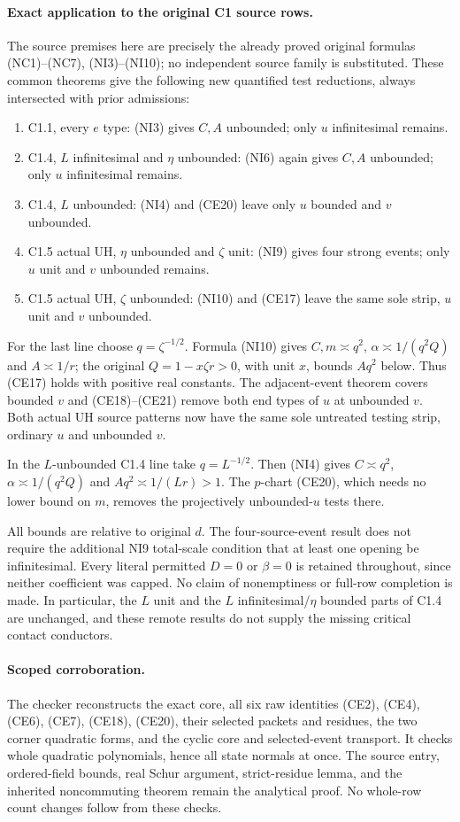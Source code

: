 \paragraph{Exact application to the original C1 source rows.}
The source premises here are precisely the already proved original
formulas (NC1)--(NC7), (NI3)--(NI10); no independent source family is
substituted. These common theorems give the following new quantified
test reductions, always intersected with prior admissions:
\begin{enumerate}
\item C1.1, every $e$ type: (NI3) gives $C,A$ unbounded;
only $u$ infinitesimal remains.
\item C1.4, $L$ infinitesimal and $\eta$ unbounded: (NI6)
again gives $C,A$ unbounded; only $u$ infinitesimal remains.
\item C1.4, $L$ unbounded: (NI4) and (CE20) leave only
$u$ bounded and $v$ unbounded.
\item C1.5 actual UH, $\eta$ unbounded and $\zeta$ unit:
(NI9) gives four strong events; only $u$ unit and $v$ unbounded remains.
\item C1.5 actual UH, $\zeta$ unbounded: (NI10) and (CE17)
leave the same sole strip, $u$ unit and $v$ unbounded.
\end{enumerate}
For the last line choose $q=\zeta^{-1/2}$. Formula (NI10) gives
$C,m\asymp q^2$, $\alpha\asymp1/(q^2Q)$ and $A\asymp1/r$;
the original $Q=1-x\zeta r>0$, with unit $x$, bounds $Aq^2$ below.
Thus (CE17) holds with positive real constants. The adjacent-event
theorem covers bounded $v$ and (CE18)--(CE21) remove both end types of
$u$ at unbounded $v$. Both actual UH source patterns now have the same
sole untreated testing strip, ordinary $u$ and unbounded $v$.

In the $L$-unbounded C1.4 line take $q=L^{-1/2}$.
Then (NI4) gives $C\asymp q^2$, $\alpha\asymp1/(q^2Q)$ and
$Aq^2\asymp1/(Lr)>1$. The $p$-chart (CE20), which needs no lower
bound on $m$, removes the projectively unbounded-$u$ tests there.

All bounds are relative to original $d$. The four-source-event result
does not require the additional NI9 total-scale condition that at least
one opening be infinitesimal. Every literal permitted $D=0$ or
$\beta=0$ is retained throughout, since neither coefficient was capped.
No claim of nonemptiness or full-row completion is made. In particular,
the $L$ unit and the $L$ infinitesimal/$\eta$ bounded parts of C1.4 are
unchanged, and these remote results do not supply the missing critical
contact conductors.

\paragraph{Scoped corroboration.}
The checker reconstructs the exact core, all six raw identities
(CE2), (CE4), (CE6), (CE7), (CE18), (CE20), their selected packets and residues, the
two corner quadratic forms, and the cyclic core and selected-event
transport. It checks whole quadratic polynomials, hence all state normals
at once. The source entry, ordered-field bounds, real Schur argument,
strict-residue lemma, and the inherited noncommuting theorem remain the
analytical proof. No whole-row count changes follow from these checks.
